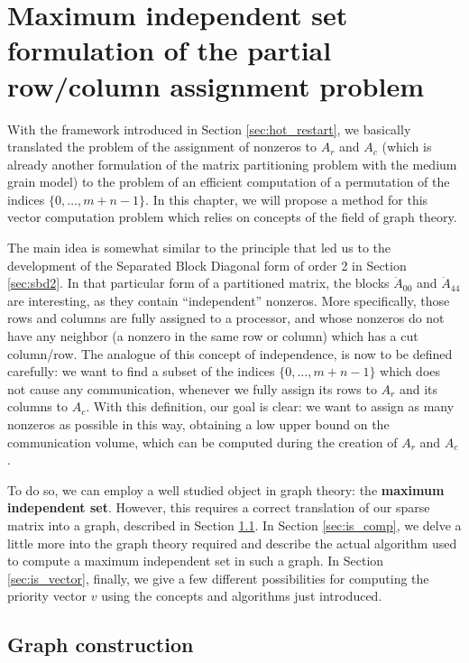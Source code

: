 \chapter{Maximum independent set formulation of the partial row/column assignment problem} \label{chap:independent_set}

With the framework introduced in Section \ref{sec:hot_restart}, we basically translated the problem of the assignment of nonzeros to $A_r$ and $A_c$ (which is already another formulation of the matrix partitioning problem with the medium grain model) to the problem of an efficient computation of a permutation of the indices $\{0,\dots,m+n-1\}$. In this chapter, we will propose a method for this vector computation problem which relies on concepts of the field of graph theory.

The main idea is somewhat similar to the principle that led us to the development of the Separated Block Diagonal form of order 2 in Section \ref{sec:sbd2}. In that particular form of a partitioned matrix, the blocks $\ddot{A}_{00}$ and $\ddot{A}_{44}$ are interesting, as they contain ``independent'' nonzeros. More specifically, those rows and columns are fully assigned to a processor, and whose nonzeros do not have any neighbor (a nonzero in the same row or column) which has a cut column/row. The analogue of this concept of independence, is now to be defined carefully: we want to find a subset of the indices $\{0,\dots,m+n-1\}$ which does not cause any communication, whenever we fully assign its rows to $A_r$ and its columns to $A_c$. With this definition, our goal is clear: we want to assign as many nonzeros as possible in this way, obtaining a low upper bound on the communication volume, which can be computed during the creation of $A_r$ and $A_c$.

To do so, we can employ a well studied object in graph theory: the \textbf{maximum independent set}. However, this requires a correct translation of our sparse matrix into a graph, described in Section \ref{sec:is_graph}. In Section \ref{sec:is_comp}, we delve a little more into the graph theory required and describe the actual algorithm used to compute a maximum independent set in such a graph. In Section \ref{sec:is_vector}, finally, we give a few different possibilities for computing the priority vector $v$ using the concepts and algorithms just introduced.

\section{Graph construction} \label{sec:is_graph}

